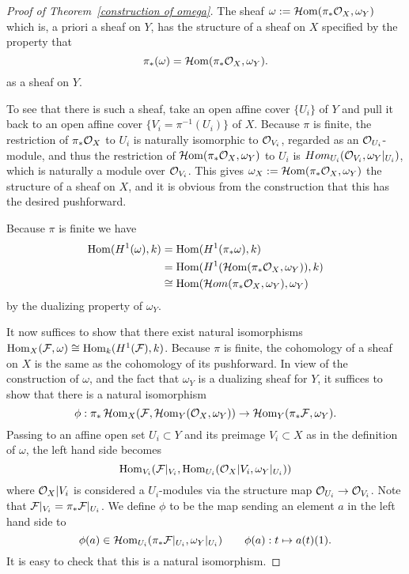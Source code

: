 \begin{proof}[Proof of Theorem~\ref{construction of omega}]
The sheaf  
$\omega:= \operatorname{{\mathcal H} om}(\pi_{*}{\mathcal O}_{X}, \omega_{Y})$
which is, a priori a sheaf on $Y$, has the structure of a sheaf on $X$
specified by the property that
$$
\pi_{*}(\omega) = \operatorname{{\mathcal H} om}(\pi_{*}{\mathcal O}_{X}, \omega_{Y}).
$$
as a sheaf on $Y$.

To see that there is such a sheaf, take an open affine cover $\{U_{i}\}$ of $Y$ and pull it back to an open affine cover $\{V_{i} = \pi^{-1}(U_{i})\}$ of $X$. Because $\pi$ is finite, the restriction of 
$\pi_{*} {\mathcal O}_{X}$ to $U_{i}$ is naturally isomorphic to ${\mathcal O}_{V_{i}}$, regarded as an ${\mathcal O}_{U_{i}}$-module, and thus the restriction of
$\operatorname{{\mathcal H} om}(\pi_{*}{\mathcal O}_{X}, \omega_{Y})$ to $U_{i}$ is 
$Hom_{U_{i}}({\mathcal O}_{V_{i}}, \omega_{Y}|_{U_{i}})$,
which is naturally a module over ${\mathcal O}_{V_{i}}$. This gives $\omega_{X}:= \operatorname{{\mathcal H} om}(\pi_{*}{\mathcal O}_{X}, \omega_{Y})$
the structure of a sheaf on $X$, and it is obvious from the construction that this has the desired pushforward. 

Because $\pi$ is finite we have
\begin{align*}
 \operatorname{Hom}({H}^{1}(\omega),k) &= \operatorname{Hom}(H^{1}(\pi_{*}\omega), k)\\ 
&= \operatorname{Hom}({H}^{1}(\operatorname{{\mathcal H} om}(\pi_{*}{\mathcal O}_{X}, \omega_{Y})),k)\\
&\cong \operatorname{Hom}(\mathcal{H}om(\pi_{*}{\mathcal O}_{X},\omega_{Y}), \omega_{Y})
\end{align*}
by the dualizing property of $\omega_{Y}$. 


It now suffices to show that there exist natural isomorphisms $\operatorname{Hom}_{X}({\mathcal F}, \omega) \cong \operatorname{Hom}_{k}(H^{1}({\mathcal F}), k)$.  Because $\pi$ is finite, the cohomology of a sheaf on $X$ is the same as the cohomology of its pushforward. In view of the construction of $\omega$, and the fact that $\omega_{Y}$ is a dualizing sheaf for $Y$, it suffices to show that there is a natural isomorphism
$$
\phi: \pi_{*}\operatorname{{\mathcal H} om}_{X}({\mathcal F},\operatorname{{\mathcal H} om}_{Y}({\mathcal O}_{X}, \omega_{Y})) \to \operatorname{{\mathcal H} om}_{Y}(\pi_{*}{\mathcal F}, \omega_{Y}).
$$
Passing to an affine open set $U_{i}\subset Y$ and its preimage $V_{i}\subset X$
as in the definition of $\omega$,  the left hand side becomes
$$
\operatorname{Hom}_{V_{i}}({\mathcal F}|_{V_{i}}, \operatorname{Hom}_{U_{i}}({\mathcal O}_{X}|V_{i}, \omega_{Y}|_{U_{i}}))
$$
where ${\mathcal O}_{X}|V_{i}$ is considered a $U_{i}$-modules via the structure
map ${\mathcal O}_{U_{i}} \to {\mathcal O}_{V_{i}}$.  Note that ${\mathcal F}|_{V_{i}} = \pi_{*}{\mathcal F}|_{U_{i}}$. We define
$\phi$ to be the map sending an element $a$ in the left hand side to 
$$
\phi(a) \in \operatorname{{\mathcal H} om}_{U_{i}}(\pi_{*}{\mathcal F}|_{U_{i}}, \omega_{Y}|_{U_{i}})\qquad \phi(a): t \mapsto a(t)(1).
$$
It is easy to check that this is a natural
isomorphism. 
\end{proof}


